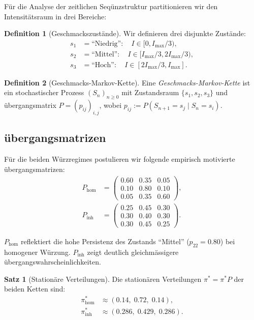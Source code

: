 ﻿\documentclass[12pt,a4paper]{article}
\theoremstyle{definition}
\newtheorem{definition}{Definition}[section]
\newtheorem{theorem}{Satz}[section]
\begin{document}
Für die Analyse der zeitlichen Seqünzstruktur partitionieren wir den
Intensitätsraum in drei Bereiche:

\begin{definition}[Geschmackszustände]
Wir definieren drei disjunkte Zustände:
\begin{align*}
  s_1 &= \text{``Niedrig''}: \quad I \in [0, I_{\max}/3), \\
  s_2 &= \text{``Mittel''}: \quad I \in [I_{\max}/3, 2I_{\max}/3), \\
  s_3 &= \text{``Hoch''}: \quad I \in [2I_{\max}/3, I_{\max}].
\end{align*}
\end{definition}

\begin{definition}[Geschmacks-Markov-Kette]
Eine \emph{Geschmacks-Markov-Kette} ist ein stochastischer Prozess
$(S_n)_{n \geq 0}$ mit Zustandsraum $\{s_1, s_2, s_3\}$ und
übergangsmatrix $P = (p_{ij})_{i,j}$, wobei
$p_{ij} := P(S_{n+1} = s_j \mid S_n = s_i)$.
\end{definition}

\subsection{übergangsmatrizen}

Für die beiden Würzregimes postulieren wir folgende empirisch
motivierte übergangsmatrizen:
\begin{align}
  P_{\mathrm{hom}} &= \begin{pmatrix}
    0.60 & 0.35 & 0.05 \\
    0.10 & 0.80 & 0.10 \\
    0.05 & 0.35 & 0.60
  \end{pmatrix}, \label{eq:phom} \\
  P_{\mathrm{inh}} &= \begin{pmatrix}
    0.25 & 0.45 & 0.30 \\
    0.30 & 0.40 & 0.30 \\
    0.30 & 0.45 & 0.25
  \end{pmatrix}. \label{eq:pinh}
\end{align}

$P_{\mathrm{hom}}$ reflektiert die hohe Persistenz des Zustands ``Mittel''
($p_{22} = 0.80$) bei homogener Würzung. $P_{\mathrm{inh}}$ zeigt deutlich
gleichmässigere übergangswahrs\-cheinlichkeiten.

\begin{theorem}[Stationäre Verteilungen]
Die stationären Verteilungen $\pi^* = \pi^* P$ der beiden Ketten sind:
\begin{align*}
  \pi_{\mathrm{hom}}^* &\approx (0.14,\; 0.72,\; 0.14), \\
  \pi_{\mathrm{inh}}^* &\approx (0.286,\; 0.429,\; 0.286).
\end{align*}
\end{theorem}
\end{document}
